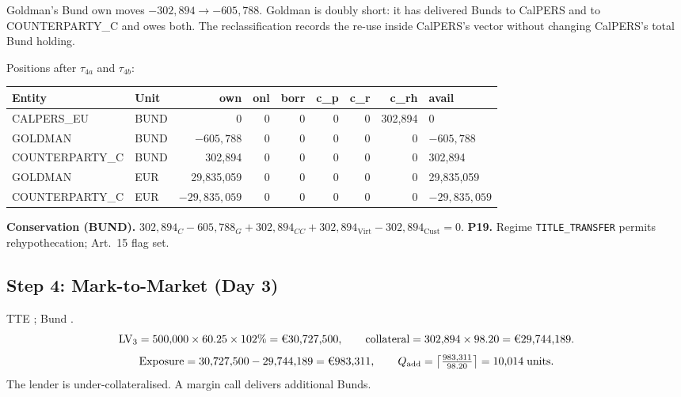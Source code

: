\noindent Goldman's Bund $\mathrm{own}$ moves $-302{,}894 \to -605{,}788$. Goldman is doubly short: it has delivered Bunds to CalPERS and to COUNTERPARTY\_C and owes both. The reclassification records the re-use inside CalPERS's vector without changing CalPERS's total Bund holding.

Positions after $\tau_{4a}$ and $\tau_{4b}$:

\begin{center}\small
\begin{tabular}{l l r r r r r r l}
\toprule
\textbf{Entity} & \textbf{Unit} & own & onl & borr & c\_p & c\_r & c\_rh & avail \\
\midrule
CALPERS\_EU & BUND & 0 & 0 & 0 & 0 & 0 & 302{,}894 & 0 \\
GOLDMAN & BUND & $-605{,}788$ & 0 & 0 & 0 & 0 & 0 & $-605{,}788$ \\
COUNTERPARTY\_C & BUND & 302{,}894 & 0 & 0 & 0 & 0 & 0 & 302{,}894 \\
GOLDMAN & EUR & 29{,}835{,}059 & 0 & 0 & 0 & 0 & 0 & 29{,}835{,}059 \\
COUNTERPARTY\_C & EUR & $-29{,}835{,}059$ & 0 & 0 & 0 & 0 & 0 & $-29{,}835{,}059$ \\
\bottomrule
\end{tabular}
\end{center}

\noindent\textbf{Conservation (BUND).} $302{,}894_C - 605{,}788_G + 302{,}894_{CC} + 302{,}894_{\mathrm{Virt}} - 302{,}894_{\mathrm{Cust}} = 0$. \checkmark\quad
\textbf{P19.} Regime \texttt{TITLE\_TRANSFER} permits rehypothecation; Art.~15 flag set. \checkmark

\subsection{Step 4: Mark-to-Market (Day 3)}
\label{sec:eu-step4}

TTE ; Bund .
\[
\mathrm{LV}_3 = 500{,}000 \times 60.25 \times 102\% = \text{\EUR{30,727,500}}, \qquad
\text{collateral} = 302{,}894 \times 98.20 = \text{\EUR{29,744,189}}.
\]
\[
\text{Exposure} = 30{,}727{,}500 - 29{,}744{,}189 = \text{\EUR{983,311}}, \qquad
Q_{\mathrm{add}} = \left\lceil \tfrac{983{,}311}{98.20} \right\rceil = 10{,}014 \;\text{units}.
\]
The lender is under-collateralised. A margin call delivers additional Bunds.

